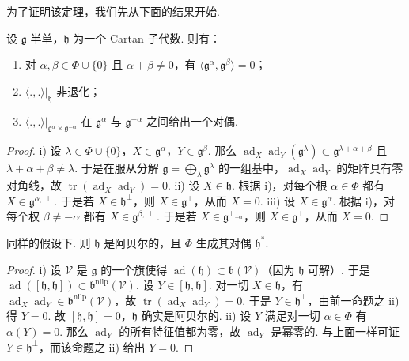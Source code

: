 为了证明该定理，我们先从下面的结果开始.
\begin{proposition}\label{prop:lie-2-5-4}
设 $\mathfrak g$ 半单，$\mathfrak h$ 为一个 Cartan 子代数. 则有：
\begin{enumerate}[label=\roman*)]
\item 对 $\alpha,\beta\in\Phi\cup\{0\}$ 且 $\alpha+\beta\neq0$，有 $\langle\mathfrak g^{\alpha},\mathfrak g^{\beta}\rangle=0$；
\item $\langle.,.\rangle|_{\mathfrak h}$ 非退化；
\item $\langle.,.\rangle|_{\mathfrak g^{\alpha}\times\mathfrak g^{-\alpha}}$ 在 $\mathfrak g^{\alpha}$ 与 $\mathfrak g^{-\alpha}$ 之间给出一个对偶.
\end{enumerate}
\end{proposition}
\begin{proof}
i) 设 $\lambda\in\Phi\cup\{0\}$，$X\in\mathfrak g^{\alpha}$，$Y\in\mathfrak g^{\beta}$. 那么 $\operatorname{ad}_{X}\operatorname{ad}_{Y}(\mathfrak g^{\lambda})\subset\mathfrak g^{\lambda+\alpha+\beta}$ 且 $\lambda+\alpha+\beta\neq\lambda$. 于是在服从分解 $\mathfrak g=\bigoplus_{\lambda}\mathfrak g^{\lambda}$ 的一组基中，$\operatorname{ad}_{X}\operatorname{ad}_{Y}$ 的矩阵具有零对角线，故 $\operatorname{tr}(\operatorname{ad}_{X}\operatorname{ad}_{Y})=0$.
ii) 设 $X\in\mathfrak h$. 根据 i)，对每个根 $\alpha\in\Phi$ 都有 $X\in\mathfrak g^{\alpha,\perp}$. 于是若 $X\in\mathfrak h^{\perp}$，则 $X\in\mathfrak g^{\perp}$，从而 $X=0$.
iii) 设 $X\in\mathfrak g^{\alpha}$. 根据 i)，对每个权 $\beta\neq-\alpha$ 都有 $X\in\mathfrak g^{\beta,\perp}$. 于是若 $X\in\mathfrak g^{\perp_{-\alpha}}$，则 $X\in\mathfrak g^{\perp}$，从而 $X=0$.
\end{proof}
\begin{corollary*}
同样的假设下. 则 $\mathfrak h$ 是阿贝尔的，且 $\Phi$ 生成其对偶 $\mathfrak h^{*}$.
\end{corollary*}
\begin{proof}
i) 设 $\mathcal V$ 是 $\mathfrak g$ 的一个旗使得 $\operatorname{ad}(\mathfrak h)\subset\mathfrak b(\mathcal V)$（因为 $\mathfrak h$ 可解）. 于是 $\operatorname{ad}([\mathfrak h,\mathfrak h])\subset\mathfrak b^{\mathrm{nilp}}(\mathcal V)$. 设 $Y\in[\mathfrak h,\mathfrak h]$. 对一切 $X\in\mathfrak h$，有 $\operatorname{ad}_{X}\operatorname{ad}_{Y}\in\mathfrak b^{\mathrm{nilp}}(\mathcal V)$，故 $\operatorname{tr}(\operatorname{ad}_{X}\operatorname{ad}_{Y})=0$. 于是 $Y\in\mathfrak h^{\perp}$，由前一命题之 ii) 得 $Y=0$. 故 $[\mathfrak h,\mathfrak h]=0$，$\mathfrak h$ 确实是阿贝尔的.
ii) 设 $Y$ 满足对一切 $\alpha\in\Phi$ 有 $\alpha(Y)=0$. 那么 $\operatorname{ad}_{Y}$ 的所有特征值都为零，故 $\operatorname{ad}_{Y}$ 是幂零的. 与上面一样可证 $Y\in\mathfrak h^{\perp}$，而该命题之 ii) 给出 $Y=0$.
\end{proof}
